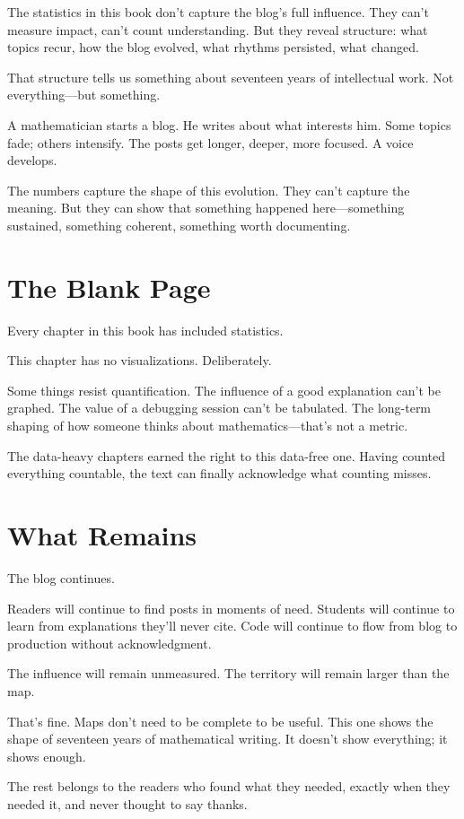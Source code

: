 The statistics in this book don't capture the blog's full influence. They can't measure impact, can't count understanding. But they reveal structure: what topics recur, how the blog evolved, what rhythms persisted, what changed.

That structure tells us something about seventeen years of intellectual work. Not everything—but something.

A mathematician starts a blog. He writes about what interests him. Some topics fade; others intensify. The posts get longer, deeper, more focused. A voice develops.

The numbers capture the shape of this evolution. They can't capture the meaning. But they can show that something happened here—something sustained, something coherent, something worth documenting.

\bigskip

\section*{The Blank Page}

Every chapter in this book has included statistics.

This chapter has no visualizations. Deliberately.

Some things resist quantification. The influence of a good explanation can't be graphed. The value of a debugging session can't be tabulated. The long-term shaping of how someone thinks about mathematics—that's not a metric.

The data-heavy chapters earned the right to this data-free one. Having counted everything countable, the text can finally acknowledge what counting misses.

\bigskip

\section*{What Remains}

The blog continues.

Readers will continue to find posts in moments of need. Students will continue to learn from explanations they'll never cite. Code will continue to flow from blog to production without acknowledgment.

The influence will remain unmeasured. The territory will remain larger than the map.

That's fine. Maps don't need to be complete to be useful. This one shows the shape of seventeen years of mathematical writing. It doesn't show everything; it shows enough.

The rest belongs to the readers who found what they needed, exactly when they needed it, and never thought to say thanks.
